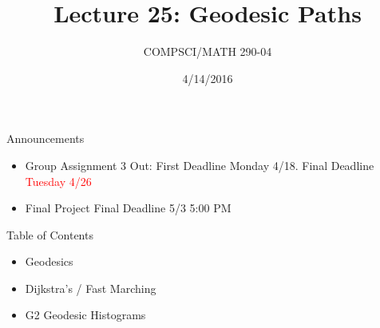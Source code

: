 \documentclass{beamer}
\title{Lecture 25: Geodesic Paths}
\date{4/14/2016}
\institute{Chris Tralie, Duke University}
\author{COMPSCI/MATH 290-04}
\begin{document}
\frame{\titlepage}

\begin{frame}{Announcements}
\begin{itemize}[label=$\vartriangleright$]

\item Group Assignment 3 Out: First Deadline Monday 4/18.  Final Deadline \textcolor{red}{Tuesday 4/26}

\item Final Project Final Deadline 5/3 5:00 PM

\end{itemize}

\end{frame}

\begin{frame}{Table of Contents}

\begin{itemize}[label=$\blacktriangleright$]
	\item Geodesics
\end{itemize}

\begin{itemize}[label=$\vartriangleright$]
	\item Dijkstra's / Fast Marching
\end{itemize}

\begin{itemize}[label=$\vartriangleright$]
	\item G2 Geodesic Histograms
\end{itemize}

\end{frame}
\end{document}
